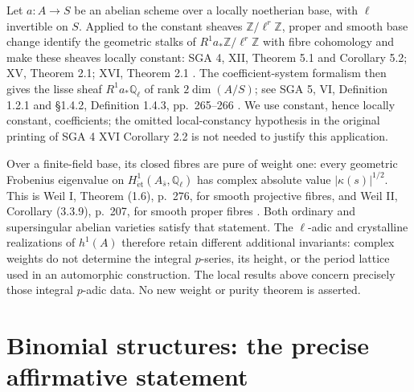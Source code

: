 \documentclass[11pt,a4paper]{article}
\theoremstyle{definition}\newtheorem{remark}[theorem]{Remark}
\newcommand{\Z}{\mathbb Z}\newcommand{\Q}{\mathbb Q}\newcommand{\F}{\mathbb F}
\begin{document}
Let $a:A\to S$ be an abelian scheme over a locally noetherian base, with $\ell$ invertible on $S$. Applied to the constant sheaves $\Z/\ell^r\Z$, proper and smooth base change identify the geometric stalks of $R^1a_*\Z/\ell^r\Z$ with fibre cohomology and make these sheaves locally constant: SGA 4, XII, Theorem 5.1 and Corollary 5.2; XV, Theorem 2.1; XVI, Theorem 2.1 \cite{SGA4}. The coefficient-system formalism then gives the lisse sheaf $R^1a_*\Q_\ell$ of rank $2\dim(A/S)$; see SGA 5, VI, Definition 1.2.1 and \S1.4.2, Definition 1.4.3, pp.~265--266 \cite{SGA5}. We use constant, hence locally constant, coefficients; the omitted local-constancy hypothesis in the original printing of SGA 4 XVI Corollary 2.2 is not needed to justify this application.

Over a finite-field base, its closed fibres are pure of weight one: every geometric Frobenius eigenvalue on $H^1_{\mathrm{\acute et}}(A_{\bar s},\Q_\ell)$ has complex absolute value $|\kappa(s)|^{1/2}$. This is Weil I, Theorem (1.6), p.~276, for smooth projective fibres, and Weil II, Corollary (3.3.9), p.~207, for smooth proper fibres \cite{WeilI,WeilII}. Both ordinary and supersingular abelian varieties satisfy that statement. The $\ell$-adic and crystalline realizations of $h^1(A)$ therefore retain different additional invariants: complex weights do not determine the integral $p$-series, its height, or the period lattice used in an automorphic construction. The local results above concern precisely those integral $p$-adic data. No new weight or purity theorem is asserted.

\section{Binomial structures: the precise affirmative statement}
\end{document}
